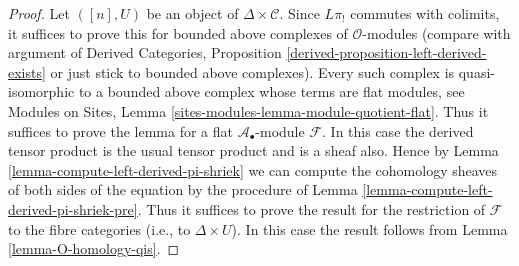 \documentclass[10pt,a4paper]{amsart}
\theoremstyle{plain}
\theoremstyle{definition}
\theoremstyle{remark}
\numberwithin{equation}{subsection}
\begin{document}
\begin{proof}
Let $([n], U)$ be an object of $\Delta \times \mathcal{C}$. Since $L\pi_!$
commutes with colimits, it suffices to prove this for bounded above complexes
of $\mathcal{O}$-modules (compare with argument of
Derived Categories, Proposition \ref{derived-proposition-left-derived-exists}
or just stick to bounded above complexes). Every such complex is
quasi-isomorphic to a bounded above complex whose terms are flat modules, see
Modules on Sites, Lemma \ref{sites-modules-lemma-module-quotient-flat}.
Thus it suffices to prove the lemma for a flat $\mathcal{A}_\bullet$-module
$\mathcal{F}$. In this case the derived tensor product is the usual
tensor product and is a sheaf also. Hence by
Lemma \ref{lemma-compute-left-derived-pi-shriek}
we can compute the cohomology
sheaves of both sides of the equation by the procedure of
Lemma \ref{lemma-compute-left-derived-pi-shriek-pre}.
Thus it suffices to prove the result for the restriction of
$\mathcal{F}$ to the fibre categories (i.e., to $\Delta \times U$).
In this case the result follows from Lemma \ref{lemma-O-homology-qis}.
\end{proof}
\end{document}
